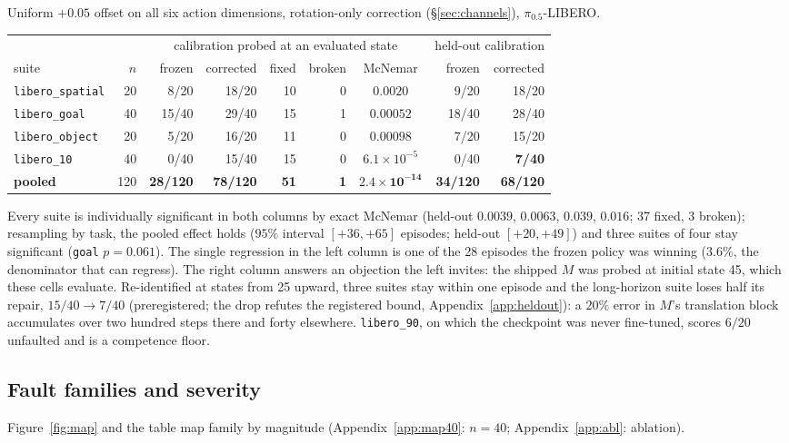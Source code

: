 \documentclass{article}
\newcommand{\code}[1]{\texttt{\small #1}}
\begin{document}
Uniform $+0.05$ offset on all six action dimensions, rotation-only correction
(\S\ref{sec:channels}), $\pi_{0.5}$-LIBERO.

\begin{center}\small
\begin{tabular}{lrrrrrcrr}
\toprule
& & \multicolumn{5}{c}{calibration probed at an evaluated state} & \multicolumn{2}{c}{held-out calibration} \\
\cmidrule(lr){3-7}\cmidrule(lr){8-9}
suite & $n$ & frozen & corrected & fixed & broken & McNemar & frozen & corrected \\
\midrule
\code{libero\_spatial} & 20 & 8/20 & 18/20 & 10 & 0 & $0.0020$ & 9/20 & 18/20 \\
\code{libero\_goal}    & 40 & 15/40 & 29/40 & 15 & 1 & $0.00052$ & 18/40 & 28/40 \\
\code{libero\_object}  & 20 & 5/20 & 16/20 & 11 & 0 & $0.00098$ & 7/20 & 15/20 \\
\code{libero\_10}      & 40 & 0/40 & 15/40 & 15 & 0 & $6.1\times10^{-5}$ & 0/40 & \textbf{7/40} \\
\midrule
\textbf{pooled} & 120 & \textbf{28/120} & \textbf{78/120} & \textbf{51} & \textbf{1} & $\mathbf{2.4\times10^{-14}}$ & \textbf{34/120} & \textbf{68/120} \\
\bottomrule
\end{tabular}
\end{center}

Every suite is individually significant in both columns by exact McNemar (held-out $0.0039$,
$0.0063$, $0.039$, $0.016$; 37 fixed, 3 broken); resampling by task, the pooled effect holds
($95\%$ interval $[+36,+65]$ episodes; held-out $[+20,+49]$) and three suites of four stay
significant (\code{goal} $p=0.061$). The single regression in the left column is one
of the 28 episodes the frozen policy was winning ($3.6\%$, the denominator that can regress).
The right column answers an objection the left invites: the shipped $M$ was probed at initial
state 45, which these cells evaluate. Re-identified at states from 25 upward, three suites stay
within one episode and the long-horizon suite loses half its repair, $15/40\to7/40$
(preregistered; the drop refutes the registered bound, Appendix~\ref{app:heldout}): a $20\%$
error in $M$'s translation block accumulates over two hundred steps there and forty elsewhere. \code{libero\_90}, on which the checkpoint was never fine-tuned,
scores $6/20$ unfaulted and is a competence floor.

\subsection{Fault families and severity}
\label{sec:severity}
Figure~\ref{fig:map} and the table map family by magnitude (Appendix~\ref{app:map40}: $n=40$;
Appendix~\ref{app:abl}: ablation).
\end{document}
